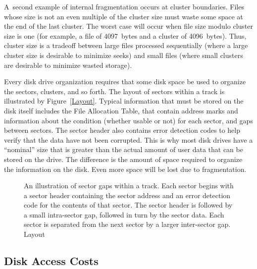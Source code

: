 A~second example of internal fragmentation occurs at cluster
boundaries.
Files whose size is not an even multiple of the cluster size must
waste some space at the end of the last cluster.
The worst case will occur when file size modulo cluster size is one
(for example, a file of 4097~bytes and a cluster of 4096~bytes).
Thus, cluster size is a tradeoff between large files
processed sequentially (where a large cluster size is desirable to
minimize seeks) and small files (where small clusters are desirable to
minimize wasted storage).

Every disk drive organization requires that some disk space be used
to organize the sectors, clusters, and so forth.
The layout of sectors within a track is illustrated by
Figure~\ref{Layout}.
Typical information that must be stored on the disk itself includes
the File Allocation Table,  that contain address
marks and information about the condition (whether usable or not) for
each sector, and gaps between sectors.
The sector header also contains error detection codes to help verify
that the data have not been corrupted.
This is why most disk drives have a ``nominal'' size that is greater
than the actual amount of user data that can be stored on the drive.
The difference is the amount of space required to organize the
information on the disk.
Even more space will be lost due to
fragmentation.

\begin{figure}
\vspace{-\smallskipamount}

{An illustration of sector gaps within a track.
Each sector begins with a sector header containing the sector address
and an error detection code for the contents of that sector.
The sector header is followed by a small intra-sector gap, followed in
turn by the sector data.
Each sector is separated from the next sector by a larger inter-sector gap.}
{Layout}
\bigskip
\end{figure}

\newpage

\subsection {Disk Access Costs}

